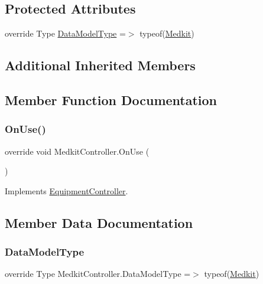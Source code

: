 \subsection*{Protected Attributes}
\begin{DoxyCompactItemize}
\item 
override Type \mbox{\hyperlink{class_medkit_controller_a6cad77e4270f7dcc10e7dc0e308d2895}{Data\+Model\+Type}} =$>$ typeof(\mbox{\hyperlink{class_medkit}{Medkit}})
\end{DoxyCompactItemize}
\subsection*{Additional Inherited Members}


\subsection{Member Function Documentation}
\mbox{\label{class_medkit_controller_a2958e0af81978b3a5c616ecdbeb520d3}} 
\subsubsection{\texorpdfstring{On\+Use()}{OnUse()}}
{\footnotesize\ttfamily override void Medkit\+Controller.\+On\+Use (\begin{DoxyParamCaption}{ }\end{DoxyParamCaption})\hspace{0.3cm}{\ttfamily [virtual]}}



Implements \mbox{\hyperlink{class_equipment_controller_ad15c45b6812eaefdaf26636ed8c45ab4}{Equipment\+Controller}}.



\subsection{Member Data Documentation}
\mbox{\label{class_medkit_controller_a6cad77e4270f7dcc10e7dc0e308d2895}} 
\subsubsection{\texorpdfstring{Data\+Model\+Type}{DataModelType}}
{\footnotesize\ttfamily override Type Medkit\+Controller.\+Data\+Model\+Type =$>$ typeof(\mbox{\hyperlink{class_medkit}{Medkit}})\hspace{0.3cm}{\ttfamily [protected]}}

